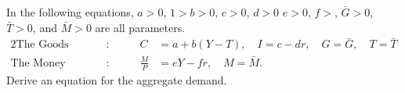 \documentclass[12pt,a4paper]{exam}
\begin{document}
\begin{questions}
	\question In the following equations, $a>0$, $1>b>0$, $c>0$, $d>0$
			$e>0$, $f>$, $\bar{G}>0$, $\bar{T}>0$, and $\bar{M}>0$ are all parameters.
			\begin{alignat*}{2}
				\text{The Goods Market}&:&\qquad C&=a+b(Y-T),\quad I=c-dr,\quad
				G=\bar{G},\quad T=\bar{T}\\
				\text{The Money Market}&:&\qquad \frac{M}{P}&=eY-fr,\quad
				M=\bar{M}.
			\end{alignat*}
			Derive an equation for the aggregate demand.
\end{questions}
\end{document}
